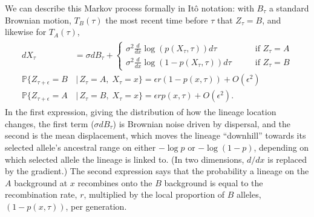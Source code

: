 \documentclass[11pt,letterpaper]{article}
\newcommand{\plr}[1]{{\em \color{blue} #1}}
\newcommand{\E}{\mathbb{E}}
\renewcommand{\P}{\mathbb{P}}
\newcommand{\given}{\,\vert\,}
\begin{document}
We can describe this Markov process formally in It\^o notation:
with $B_\tau$ a standard Brownian motion,
$T_B(\tau)$ the most recent time before $\tau$ that $Z_\tau = B$, and likewise for $T_A(\tau)$,
\begin{align}
    \begin{aligned} \label{eqn:lineage_motion}
        dX_\tau &= \sigma dB_\tau + \begin{cases}
            \sigma^2 \frac{d}{dx} \log(p(X_\tau,\tau)) d\tau \qquad & \text{if } Z_\tau = A \\
             \sigma^2 \frac{d}{dx} \log(1-p(X_\tau,\tau)) d\tau \qquad & \text{if } Z_\tau = B 
        \end{cases} \\
        \P\{ Z_{\tau+\epsilon} = B &\given Z_\tau = A, \; X_\tau=x \} = \epsilon r (1-p(x,\tau)) + O(\epsilon^2) \\
        \P\{ Z_{\tau+\epsilon} = A &\given Z_\tau = B, \; X_\tau=x \} = \epsilon r p(x,\tau) + O(\epsilon^2)  .
    \end{aligned}
\end{align}
In the first expression, giving the distribution of how the lineage location changes,
the first term ($\sigma dB_\tau$) is Brownian noise driven by dispersal,
and the second is the mean displacement, which moves the lineage ``downhill'' towards its selected allele's ancestral range on either $-\log p$ or $-\log (1-p)$,
depending on which selected allele the lineage is linked to.
(In two dimensions, $d/dx$ is replaced by the gradient.)
The second expression says that the probability a lineage on the $A$ background at $x$
recombines onto the $B$ background
is equal to the recombination rate, $r$, multiplied by the local proportion of $B$ alleles, $(1-p(x,\tau))$,
per generation.
\end{document}
